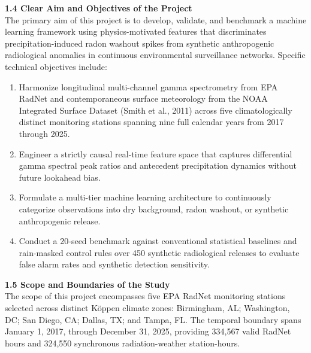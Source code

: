 \documentclass[11pt,a4paper]{article}
\begin{document}
\begin{framed}
\vspace{0.6em}
\noindent\textbf{1.4 Clear Aim and Objectives of the Project}\\[0.3em]
The primary aim of this project is to develop, validate, and benchmark a machine learning framework using physics-motivated features that discriminates precipitation-induced radon washout spikes from synthetic anthropogenic radiological anomalies in continuous environmental surveillance networks. Specific technical objectives include:
\begin{enumerate}
    \item Harmonize longitudinal multi-channel gamma spectrometry from EPA RadNet and contemporaneous surface meteorology from the NOAA Integrated Surface Dataset (Smith et al., 2011) across five climatologically distinct monitoring stations spanning nine full calendar years from 2017 through 2025.
    \item Engineer a strictly causal real-time feature space that captures differential gamma spectral peak ratios and antecedent precipitation dynamics without future lookahead bias.
    \item Formulate a multi-tier machine learning architecture to continuously categorize observations into dry background, radon washout, or synthetic anthropogenic release.
    \item Conduct a 20-seed benchmark against conventional statistical baselines and rain-masked control rules  over 450 synthetic radiological releases  to evaluate false alarm rates and synthetic detection sensitivity.
\end{enumerate}

\vspace{0.6em}
\noindent\textbf{1.5 Scope and Boundaries of the Study}\\[0.3em]
The scope of this project encompasses five EPA RadNet monitoring stations selected across distinct Köppen climate zones: Birmingham, AL; Washington, DC; San Diego, CA; Dallas, TX; and Tampa, FL. The temporal boundary spans January 1, 2017, through December 31, 2025, providing 334,567 valid RadNet hours and 324,550 synchronous radiation-weather station-hours. 


\end{framed}
\end{document}
